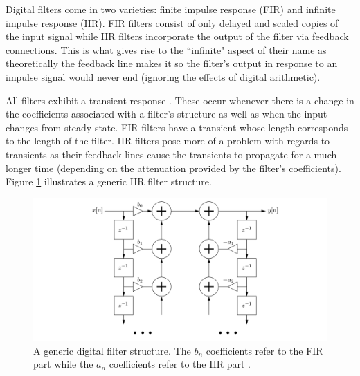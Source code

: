 \documentclass[main.tex]{subfiles}
\begin{document}
Digital filters come in two varieties: finite impulse response (FIR) and infinite impulse response (IIR). FIR filters consist of only delayed and scaled copies of the input signal while IIR filters incorporate the output of the filter via feedback connections. This is what gives rise to the ``infinite" aspect of their name as theoretically the feedback line makes it so the filter's output in response to an impulse signal would never end (ignoring the effects of digital arithmetic).

All filters exhibit a transient response . These occur whenever there is a change in the coefficients associated with a filter's structure as well as when the input changes from steady-state. FIR filters have a transient whose length corresponds to the length of the filter. IIR filters pose more of a problem with regards to transients as their feedback lines cause the transients to propagate for a much longer time (depending on the attenuation provided by the filter's coefficients). Figure \ref{fig:generic_IIR} illustrates a generic IIR filter structure.

\begin{figure}[h]
    \centering
    \includegraphics[scale=.25]{./images/diagrams/digitalFilter.png}
    \caption{A generic digital filter structure. The $b_n$ coefficients refer to the FIR part while the $a_n$ coefficients refer to the IIR part .}
    \label{fig:generic_IIR}
\end{figure}
\end{document}
